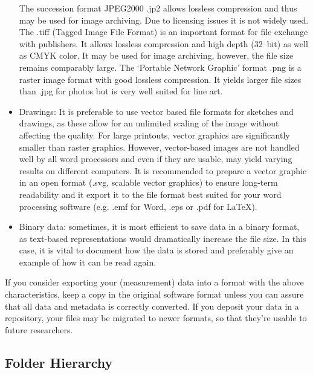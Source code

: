 \begin{itemize}
        The succession format JPEG2000 .jp2 allows lossless compression and thus
        may be used for image archiving. Due to licensing issues it is not
        widely used. The .tiff (Tagged Image File Format) is an important format
        for file exchange with publishers. It allows lossless compression and
        high depth (32 bit) as well as CMYK color. It may be used for image
        archiving, however, the file size remains comparably large. The
        `Portable Network Graphic' format .png is a raster image format with
        good lossless compression. It yields larger file sizes than .jpg for
        photos but is very well suited for line art.
  \item Drawings: It is preferable to use vector based file formats for sketches
        and drawings, as these allow for an unlimited scaling of the image
        without affecting the quality. For large printouts, vector graphics are
        significantly smaller than raster graphics. However, vector-based images
        are not handled well by all word processors and even if they are usable,
        may yield varying results on different computers. It is recommended to
        prepare a vector graphic in an open format (.svg, scalable vector
        graphics) to ensure long-term readability and it export it to the file
        format best suited for your word processing software (e.g. .emf for
        Word, .eps or .pdf for LaTeX).
  \item Binary data: sometimes, it is most efficient to save data in a binary
        format, as text-based representations would dramatically increase the
        file size. In this case, it is vital to document how the data is stored
        and preferably give an example of how it can be read again.
\end{itemize}

\noindent If you consider exporting your (measurement) data into a format
with the above characteristics, keep a copy in the original software format
unless you can assure that all data and metadata is correctly converted. If you
deposit your data in a repository, your files may be migrated to newer formats,
so that they’re usable to future researchers.

\subsection{Folder Hierarchy}

